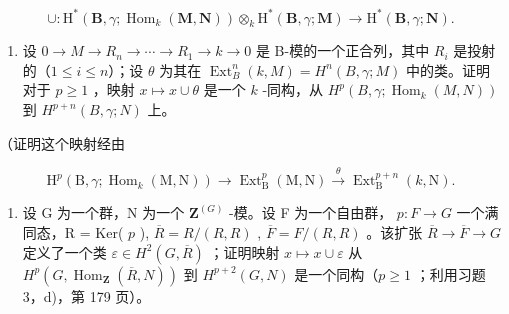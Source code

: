\[
\cup : \mathrm{H} ^ {*} (\mathbf {B}, \gamma ; \operatorname{Hom} _ {k} (\mathbf {M}, \mathbf {N})) \otimes_ {k} \mathrm{H} ^ {*} (\mathbf {B}, \gamma ; \mathbf {M}) \rightarrow \mathrm{H} ^ {*} (\mathbf {B}, \gamma ; \mathbf {N}).
\]

\begin{enumerate}
\def\labelenumi{\alph{enumi})}
\setcounter{enumi}{1}
\tightlist
\item
  设 \(0 \to M \to R_n \to \cdots \to R_1 \to k \to 0\) 是 B-模的一个正合列，其中 \(R_i\) 是投射的（\(1 \leqslant i \leqslant n\)）；设 \(\theta\) 为其在 \(\operatorname{Ext}_B^n(k, M) = H^n(B, \gamma; M)\) 中的类。证明对于 \(p \geqslant 1\) ，映射 \(x \mapsto x \cup \theta\) 是一个 \(k\) -同构，从 \(H^p(B, \gamma; \operatorname{Hom}_k(M, N))\) 到 \(H^{p+n}(B, \gamma; N)\) 上。
\end{enumerate}

（证明这个映射经由

\[
\mathrm{H} ^ {p} (\mathrm{B}, \gamma ; \operatorname{Hom} _ {k} (\mathrm{M}, \mathrm{N})) \rightarrow \operatorname{Ext} _ {\mathrm{B}} ^ {p} (\mathrm{M}, \mathrm{N}) \xrightarrow {\theta} \operatorname{Ext} _ {\mathrm{B}} ^ {p + n} (k, \mathrm{N}).
\]

\begin{enumerate}
\def\labelenumi{\alph{enumi})}
\setcounter{enumi}{2}
\tightlist
\item
  设 G 为一个群，N 为一个 \(\mathbf{Z}^{(G)}\) -模。设 F 为一个自由群， \(p: F \to G\) 一个满同态，R = Ker( \(p\) ), \(\overline{R} = R/(R, R)\) , \(\overline{F} = F/(R, R)\) 。该扩张 \(\overline{R} \to \overline{F} \to G\) 定义了一个类 \(\varepsilon \in H^2(G, \overline{R})\) ；证明映射 \(x \mapsto x \cup \varepsilon\) 从 \(H^p(G, \operatorname{Hom}_{\mathbf{Z}}(\overline{R}, N))\) 到 \(H^{p+2}(G, N)\) 是一个同构（\(p \geqslant 1\) ；利用习题 3，d)，第 179 页）。
\end{enumerate}

